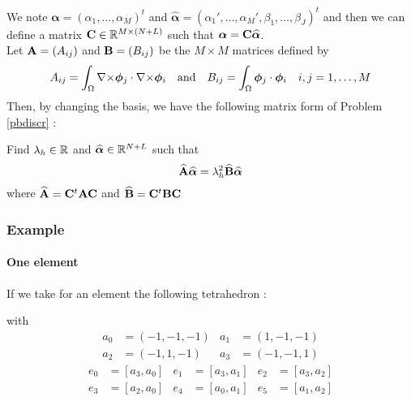 We note $\bm{\alpha}=(\alpha_1,\dots,\alpha_M)^t$ and
$\widehat{\bm{\alpha}}=(\alpha_1',\dots,\alpha_M',\beta_1,\dots,\beta_J)^t$ and
then we can define a matrix ${\mathbf{C}}\in{\mathbb{R}}^{M\times(N+L)}$ such that $\bm{\alpha}={\mathbf{C}}\widehat{\bm{\alpha}}$.\\

Let ${\mathbf{A}}=(A_{ij})$ and ${\mathbf{B}}=(B_{ij})$ be the $M\times M$ matrices defined
by 
\[A_{ij}=\int_\Omega {\nabla\times}\bm{\phi}_j\cdot{\nabla\times}\bm{\phi}_i \quad\mbox{and}\quad
B_{ij}=\int_\Omega\bm{\phi}_j\cdot\bm{\phi}_i\quad i,j=1,\dots,M \]
Then, by changing the basis, we have the following matrix form of Problem
\ref{pbdiscr} :
\begin{pb}\label{pbmat}
Find $\lambda_h\in{\mathbb{R}}$ and $\widehat{\bm{\alpha}}\in{\mathbb{R}}^{N+L}$ such that
\[ \widehat{{\mathbf{A}}}\widehat{\bm{\alpha}} =
\lambda_h^2\widehat{{\mathbf{B}}}\widehat{\bm{\alpha}} \]
where $\widehat{{\mathbf{A}}}={\mathbf{C}}^t{\mathbf{A}}{\mathbf{C}}$ and $\widehat{{\mathbf{B}}}={\mathbf{C}}^t{\mathbf{B}}{\mathbf{C}}$
\end{pb}

\subsubsection{Example}
\paragraph{One element}
If we take for an element the following tetrahedron :
\begin{figure}[H]
\centering
{}
\end{figure}
with
\begin{align*}
a_0 &= (-1,-1,-1) & a_1 &= (1,-1,-1)\\
a_2 &= (-1,1,-1) & a_3 &= (-1,-1,1)
\end{align*}
\begin{align*}
e_0 &= [a_3,a_0] & e_1 &= [a_3,a_1] & e_2 &= [a_3,a_2]\\
e_3 &= [a_2,a_0] & e_4 &= [a_0,a_1] & e_5 &= [a_1,a_2]
\end{align*}


